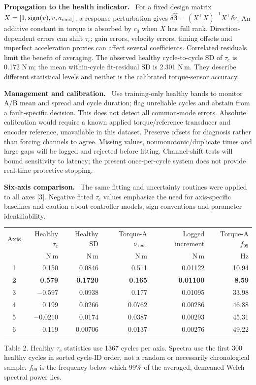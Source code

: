 \documentclass[10pt,letterpaper]{article}
\newcommand{\heading}[1]{\vspace{5pt}{\large\bfseries #1}\par\vspace{1pt}}
\newcommand{\subhead}[1]{\textbf{#1}\ }
\begin{document}
\subhead{Propagation to the health indicator.}
For a fixed design matrix $X=[1,\operatorname{sign}(v),v,a_{\rm cmd}]$, a response perturbation gives
$\delta\widehat{\boldsymbol{\beta}}=(X^\top X)^{-1}X^\top\delta r$.
An additive constant in torque is absorbed by $c_0$ when $X$ has full rank. Direction-dependent errors can shift $\tau_c$; gain errors, velocity errors, timing offsets and imperfect acceleration proxies can affect several coefficients. Correlated residuals limit the benefit of averaging. The observed healthy cycle-to-cycle SD of $\tau_c$ is 0.172 N\,m; the mean within-cycle fit-residual SD is 2.301 N\,m. They describe different statistical levels and neither is the calibrated torque-sensor accuracy.

\subhead{Management and calibration.}
Use training-only healthy bands to monitor A/B mean and spread and cycle duration; flag unreliable cycles and abstain from a fault-specific decision. This does not detect all common-mode errors. Absolute calibration would require a known applied torque/reference transducer and encoder reference, unavailable in this dataset. Preserve offsets for diagnosis rather than forcing channels to agree. Missing values, nonmonotonic/duplicate times and large gaps will be logged and rejected before fitting. Channel-shift tests will bound sensitivity to latency; the present once-per-cycle system does not provide real-time protective stopping.

\heading{Cross-Axis Context and Reproducibility}
\subhead{Six-axis comparison.}
The same fitting and uncertainty routines were applied to all axes [3]. Negative fitted $\tau_c$ values emphasize the need for axis-specific baselines and caution about controller models, sign conventions and parameter identifiability.

\begin{center}
\begin{tabular}{@{}crrrrr@{}}
\toprule
Axis & Healthy $\overline{\tau_c}$ & Healthy SD & Torque-A $\sigma_{\rm rest}$ & Logged increment & Torque-A $f_{99}$\\
 & N\,m & N\,m & N\,m & N\,m & Hz\\
\midrule
1 & 0.150 & 0.0846 & 0.511 & 0.01122 & 10.94\\
\textbf{2} & \textbf{0.579} & \textbf{0.1720} & \textbf{0.165} & \textbf{0.01100} & \textbf{8.59}\\
3 & $-0.597$ & 0.0938 & 0.177 & 0.01095 & 33.98\\
4 & 0.199 & 0.0266 & 0.0762 & 0.00286 & 46.88\\
5 & $-0.0210$ & 0.0174 & 0.0387 & 0.00293 & 45.31\\
6 & 0.119 & 0.00706 & 0.0137 & 0.00276 & 49.22\\
\bottomrule
\end{tabular}
\end{center}
{\small Table 2. Healthy $\tau_c$ statistics use 1367 cycles per axis. Spectra use the first 300 healthy cycles in sorted cycle-ID order, not a random or necessarily chronological sample. $f_{99}$ is the frequency below which 99\% of the averaged, demeaned Welch spectral power lies.}
\end{document}

